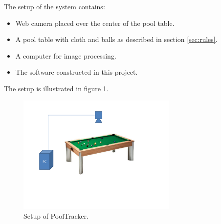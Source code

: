 The setup of the system contains:
\begin{itemize}
	\item Web camera placed over the center of the pool table.
	\item A pool table with cloth and balls as described in section \ref{sec:rules}.
	\item A computer for image processing.
	\item The software constructed in this project.
\end{itemize}

The setup is illustrated in figure \ref{fig:setup}.

\begin{figure}[H]
\begin{center}
\leavevmode
\includegraphics[width=0.7\textwidth]{images/setup}
\end{center}
\caption{Setup of PoolTracker.}
\label{fig:setup}
\end{figure}